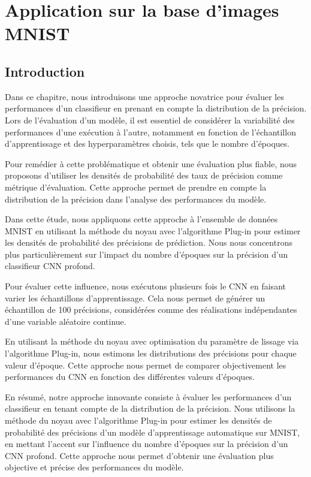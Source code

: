\chapter{Application sur la base d'images MNIST}
\section{Introduction}
Dans ce chapitre, nous introduisons une approche novatrice pour évaluer les performances d'un classifieur en prenant en compte la distribution de la précision. Lors de l'évaluation d'un modèle, il est essentiel de considérer la variabilité des performances d'une exécution à l'autre, notamment en fonction de l'échantillon d'apprentissage et des hyperparamètres choisis, tels que le nombre d'époques.

Pour remédier à cette problématique et obtenir une évaluation plus fiable, nous proposons d'utiliser les densités de probabilité des taux de précision comme métrique d'évaluation. Cette approche permet de prendre en compte la distribution de la précision dans l'analyse des performances du modèle.

Dans cette étude, nous appliquons cette approche à l'ensemble de données MNIST en utilisant la méthode du noyau avec l'algorithme Plug-in pour estimer les densités de probabilité des précisions de prédiction. Nous nous concentrons plus particulièrement sur l'impact du nombre d'époques sur la précision d'un classifieur CNN profond.

Pour évaluer cette influence, nous exécutons plusieurs fois le CNN en faisant varier les échantillons d'apprentissage. Cela nous permet de générer un échantillon de 100 précisions, considérées comme des réalisations indépendantes d'une variable aléatoire continue.

En utilisant la méthode du noyau avec optimisation du paramètre de lissage via l'algorithme Plug-in, nous estimons les distributions des précisions pour chaque valeur d'époque. Cette approche nous permet de comparer objectivement les performances du CNN en fonction des différentes valeurs d'époques.

En résumé, notre approche innovante consiste à évaluer les performances d'un classifieur en tenant compte de la distribution de la précision. Nous utilisons la méthode du noyau avec l'algorithme Plug-in pour estimer les densités de probabilité des précisions d'un modèle d'apprentissage automatique sur MNIST, en mettant l'accent sur l'influence du nombre d'époques sur la précision d'un CNN profond. Cette approche nous permet d'obtenir une évaluation plus objective et précise des performances du modèle.





